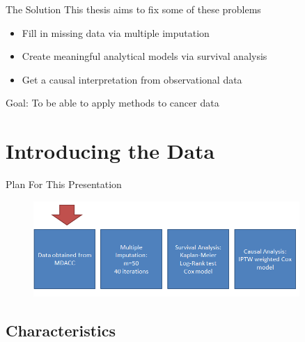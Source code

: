\begin{frame}{The Solution}
This thesis aims to fix some of these problems
  \begin{itemize}
   \item Fill in missing data via multiple imputation
   \item Create meaningful analytical models via survival analysis
   \item Get a causal interpretation from observational data
  \end{itemize}
Goal: To be able to apply methods to cancer data

\end{frame}


\section{Introducing the Data}
\begin{frame}{Plan For This Presentation}
  \begin{figure}[h!]
  \centering
    \includegraphics[width=0.9\textwidth]{data_flow}
\label{fig:data_flow}
\end{figure} 
\end{frame}

\subsection{Characteristics}


